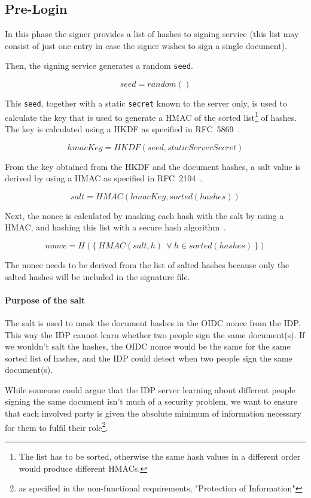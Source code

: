 \subsection{Pre-Login}\label{subsec:pre-login}
In this phase the signer provides a list of hashes to signing service
(this list may consist of just one entry in case the signer wishes to sign a single document).

Then, the signing service generates a random \texttt{seed}.

\[ seed = random() \]

This \texttt{seed}, together with a static \texttt{secret} known to the server only,
is used to calculate the key that is used to generate a \gls{HMAC}
of the sorted list\footnote{The list has to be sorted,
otherwise the same hash values in a different order would produce different \gls{HMAC}s.} of hashes.
The key is calculated using a \gls{HKDF} as specified in RFC~5869~\cite{rfc5869}.

\[ hmacKey = HKDF(seed, staticServerSecret) \]

From the key obtained from the \gls{HKDF} and the document hashes,
a salt value is derived by using a \gls{HMAC} as specified in RFC~2104~\cite{rfc2104}.

\[ salt = HMAC(hmacKey, sorted(hashes)) \]

Next, the nonce is calculated by masking each hash with the salt by using a \gls{HMAC},
and hashing this list with a secure hash algorithm~\cite{nistsha}.


\[ nonce = H(\{\ HMAC(salt, h) \ \ \forall \ h \in sorted(hashes)\ \}) \]

The nonce needs to be derived from the list of salted hashes because
only the salted hashes will be included in the signature file.


\paragraph{Purpose of the salt}
The salt is used to mask the document hashes in the \gls{OIDC} nonce from the \gls{IDP}.
This way the \gls{IDP} cannot learn whether two people sign the same document(s).
If we wouldn't salt the hashes, the \gls{OIDC} nonce would be the same for the same sorted list of hashes,
and the \gls{IDP} could detect when two people sign the same document(s).

While someone could argue that the IDP server learning about different people signing the same document
isn't much of a security problem, we want to ensure that each involved party is given the absolute minimum
of information necessary for them to fulfil their role\footnote{as specified in the non-functional requirements, "Protection of Information"}.

